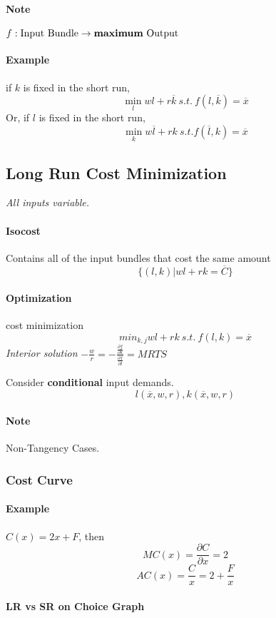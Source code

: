 \documentclass{article}
\newcommand{\pd}[2]{\frac{\partial{#1}}{\partial{#2}}}
\begin{document}
		\paragraph{Note}  $f: \text{Input Bundle} \rightarrow \text{\textbf{maximum} Output}$
		\paragraph{Example} if $k$ is fixed in the short run,
		\[
			\min_{l} wl + r\overline{k}\ s.t.\ f(l, \overline{k}) = \overline{x}
		\]
		Or, if $l$ is fixed in the short run,
		\[
			\min_{k} w\overline{l} + rk\ s.t. f(\overline{l}, k) = \overline{x}
		\]

	\subsection{Long Run Cost Minimization}
		\emph{All inputs variable.}

		\paragraph{Isocost} Contains all of the input bundles that cost the same amount
		\[
			\{(l, k) \vert wl + rk = \overline{C}\}
		\]
		\paragraph{Optimization} cost minimization
		\[
			min_{k,j} wl + rk\ s.t.\ f(l,k) = \overline{x}
		\]
		\emph{Interior solution} $-\frac{w}{r} = -\frac{\pd{f}{k}}{\pd{f}{l}} = MRTS$

		Consider \textbf{conditional} input demands.
		\[
			l(\overline{x}, w, r), k(\overline{x}, w, r)
		\]

		\paragraph{Note} Non-Tangency Cases.

		\subsubsection{Cost Curve}
		\paragraph{Example} $C(x) = 2x + F$, then 
		\[
			MC(x) = \pd{C}{x} = 2
		\]
		\[
			AC(x) = \frac{C}{x} = 2 + \frac{F}{x}
		\]
		\paragraph{LR vs SR on Choice Graph}
\end{document}
